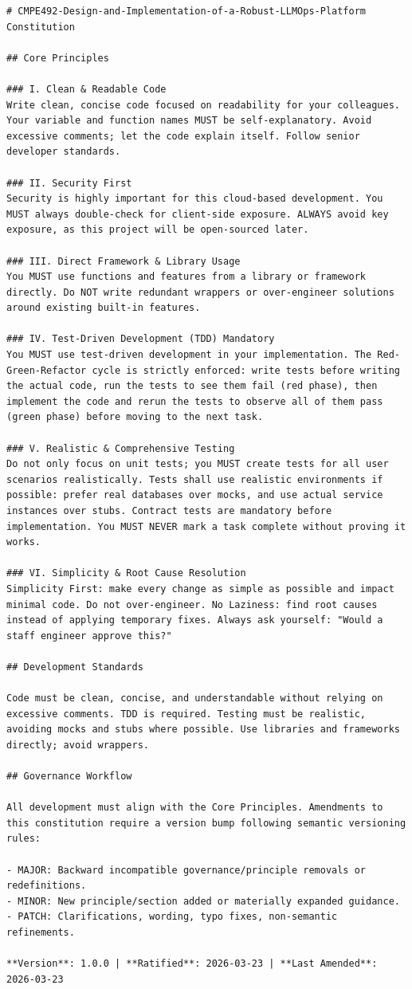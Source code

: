 \documentclass[a4paper,12pt]{report}
\begin{document}
\begin{lstlisting}[caption={Project Constitution (constitution.md)}]
# CMPE492-Design-and-Implementation-of-a-Robust-LLMOps-Platform Constitution

## Core Principles

### I. Clean & Readable Code
Write clean, concise code focused on readability for your colleagues. Your variable and function names MUST be self-explanatory. Avoid excessive comments; let the code explain itself. Follow senior developer standards.

### II. Security First
Security is highly important for this cloud-based development. You MUST always double-check for client-side exposure. ALWAYS avoid key exposure, as this project will be open-sourced later.

### III. Direct Framework & Library Usage
You MUST use functions and features from a library or framework directly. Do NOT write redundant wrappers or over-engineer solutions around existing built-in features.

### IV. Test-Driven Development (TDD) Mandatory
You MUST use test-driven development in your implementation. The Red-Green-Refactor cycle is strictly enforced: write tests before writing the actual code, run the tests to see them fail (red phase), then implement the code and rerun the tests to observe all of them pass (green phase) before moving to the next task.

### V. Realistic & Comprehensive Testing
Do not only focus on unit tests; you MUST create tests for all user scenarios realistically. Tests shall use realistic environments if possible: prefer real databases over mocks, and use actual service instances over stubs. Contract tests are mandatory before implementation. You MUST NEVER mark a task complete without proving it works.

### VI. Simplicity & Root Cause Resolution
Simplicity First: make every change as simple as possible and impact minimal code. Do not over-engineer. No Laziness: find root causes instead of applying temporary fixes. Always ask yourself: "Would a staff engineer approve this?"

## Development Standards

Code must be clean, concise, and understandable without relying on excessive comments. TDD is required. Testing must be realistic, avoiding mocks and stubs where possible. Use libraries and frameworks directly; avoid wrappers.

## Governance Workflow

All development must align with the Core Principles. Amendments to this constitution require a version bump following semantic versioning rules:

- MAJOR: Backward incompatible governance/principle removals or redefinitions.
- MINOR: New principle/section added or materially expanded guidance.
- PATCH: Clarifications, wording, typo fixes, non-semantic refinements.

**Version**: 1.0.0 | **Ratified**: 2026-03-23 | **Last Amended**: 2026-03-23
\end{lstlisting}
\end{document}
